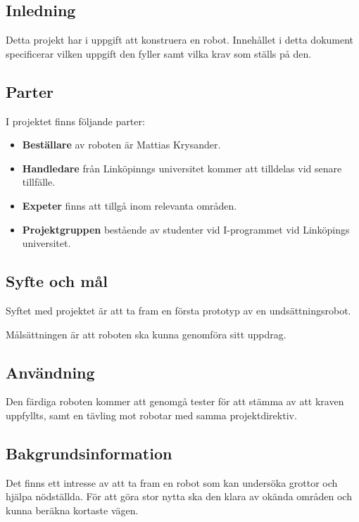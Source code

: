 \documentclass[11pt]{article}
\begin{document}
\begin{flushleft}

\section{Inledning}

Detta projekt har i uppgift att konstruera en robot. Innehållet i detta dokument specificerar vilken uppgift den fyller samt vilka krav som ställs på den.

\subsection{Parter}
I projektet finns följande parter:

\begin{itemize}
  \item \textbf{Beställare} av roboten är Mattias Krysander.
  \item \textbf{Handledare} från Linköpinngs universitet kommer att tilldelas vid senare tillfälle.
  \item \textbf{Expeter} finns att tillgå inom relevanta områden.
  \item \textbf{Projektgruppen} bestående av studenter vid I-programmet vid Linköpings universitet.
\end{itemize}

\subsection{Syfte och mål}
Syftet med projektet är att ta fram en första prototyp av en undsättningsrobot. 

Målsättningen är att roboten ska kunna genomföra sitt uppdrag.

\subsection{Användning}
Den färdiga roboten kommer att genomgå tester för att stämma av att kraven uppfyllts, samt en tävling mot robotar med samma projektdirektiv.

\subsection{Bakgrundsinformation}

Det finns ett intresse av att ta fram en robot som kan undersöka grottor och hjälpa nödställda. För att göra stor nytta ska den klara av okända områden och kunna beräkna kortaste vägen. 


\end{flushleft}
\end{document}
